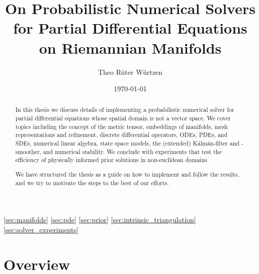 
\def\COMPILINGFROMMAIN{}


\title{On Probabilistic Numerical Solvers for Partial Differential Equations on Riemannian Manifolds}
\author{Theo Rüter Würtzen }
\date{\today}
\maketitle


\begin{abstract}
In this thesis we discuss details of implementing a probabilistic numerical solver for partial differential equations whose spatial domain is not a vector space. We cover topics including the concept of the metric tensor, embeddings of manifolds, mesh representations and refinement, discrete differential operators, ODEs, PDEs, and SDEs, numerical linear algebra, state space models, the (extended) Kálmán-filter and -smoother, and numerical stability. We conclude with experiments that test the efficiency of physically informed prior solutions in non-euclidean domains.

We have structured the thesis as a guide on how to implement and follow the results, and we try to motivate the steps to the best of our efforts.
\end{abstract}

\newpage
\tableofcontents

\ref{sec:manifolds}
\ref{sec:pde}
\ref{sec:prior}
\ref{sec:intrinsic_triangulation}
\ref{sec:solver_experiments}


\newpage
\section{Overview}\label{sec:overview}


% 

% 

% 

